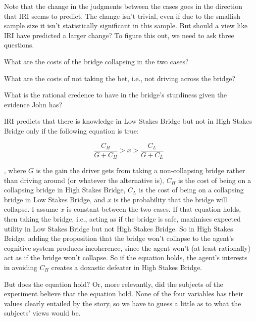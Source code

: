 \documentclass[11pt,oneside]{book}
\begin{document}
Note that the change in the judgments between the cases goes in the direction that IRI seems to predict. The change isn't trivial, even if due to the smallish sample size it isn't statistically significant in this sample. But should a view like IRI have predicted a larger change? To figure this out, we need to ask three questions.

\begin{enumerate*}
\item What are the costs of the bridge collapsing in the two cases?
\item What are the costs of not taking the bet, i.e., not driving across the bridge?
\item What is the rational credence to have in the bridge's sturdiness given the evidence John has?
\end{enumerate*}

IRI predicts that there is knowledge in Low Stakes Bridge but not in High Stakes Bridge only if the following equation is true:

\begin{equation*}
\frac{C_H}{G + C_H} > x > \frac{C_L}{G + C_L}
\end{equation*}

\noindent, where $G$ is the gain the driver gets from taking a non-collapsing bridge rather than driving around (or whatever the alternative is), $C_H$ is the cost of being on a collapsing bridge in High Stakes Bridge, $C_L$ is the cost of being on a collapsing bridge in Low Stakes Bridge, and $x$ is the probability that the bridge will collapse. I assume $x$ is constant between the two cases. If that equation holds, then taking the bridge, i.e., acting as if the bridge is safe, maximises expected utility in Low Stakes Bridge but not High Stakes Bridge. So in High Stakes Bridge, adding the proposition that the bridge won't collapse to the agent's cognitive system produces incoherence, since the agent won't (at least rationally) act as if the bridge won't collapse. So if the equation holds, the agent's interests in avoiding $C_H$ creates a doxastic defeater in High Stakes Bridge.

But does the equation hold? Or, more relevantly, did the subjects of the experiment believe that the equation hold. None of the four variables has their values clearly entailed by the story, so we have to guess a little as to what the subjects' views would be. 
\end{document}
